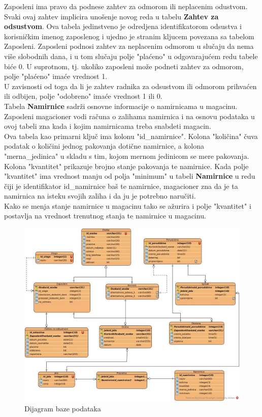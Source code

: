 Zaposleni ima pravo da podnese zahtev za odmorom ili neplacenim odustvom. Svaki ovaj zahtev implicira unošenje novog reda u tabelu \textbf{Zahtev za odsustvom}. Ova tabela jedinstveno je odredjena identifikatorom odsustva i korisničkim imenog zaposlenog i ujedno je stranim kljucem povezana sa tabelom Zaposleni. Zaposleni podnosi zahtev za neplacenim odmorom u slučaju da nema više slobodnih dana, i u tom slučaju polje "plaćeno" u odgovarajućem redu tabele biće 0. U suprotnom, tj. ukoliko zaposleni može podneti zahtev za odmorom, polje  "plaćeno" imaće vrednost 1. \\
\indent U zavisnosti od toga da li je zahtev radnika za odsustvom ili odmorom prihvaćen ili odbijen, polje "odobreno" imaće vrednost 1 ili 0. \\

Tabela \textbf{Namirnice} sadrži osnovne informacije o namirnicama u magacinu. Zaposleni magacioner vodi računa o zalihama namirnica i na osnovu podataka u ovoj tabeli zna kada i kojim namirnicama treba snabdeti magacin. \\ 
\indent Ova tabela kao primarni ključ ima kolonu "id\_namirnice". Kolona "količina" čuva podatak o količini  jednog pakovanja dotične namirnice, a kolona "merna\_jedinica"
u skladu s tim, kojom mernom jedinicom se mere pakovanja. Kolona "kvantitet" prikazuje brojno stanje pakovanja te namirnice.
Kada polje "kvantitet" ima vrednost manju od polja "minimum" u tabeli \textbf{Namirnice} u redu čiji je identifikator id\_namirnice baš te namirnice, magacioner zna da je ta namirnica na isteku svojih zaliha i da ju je potrebno naručiti. \\
\indent Kako se menja stanje namirnice u magacinu tako se ažurira i polje "kvantitet" i postavlja na vrednost trenutnog stanja te namirnice u maga\-cinu.

\begin{figure}[!ht]
    \leavevmode
    \begin{center}
    \includegraphics[height=1\textwidth]{slike/Baza.jpg}
    \end{center}
    \caption{Dijagram baze podataka}
    \label{fig:slika11}
\end{figure}
\leavevmode
